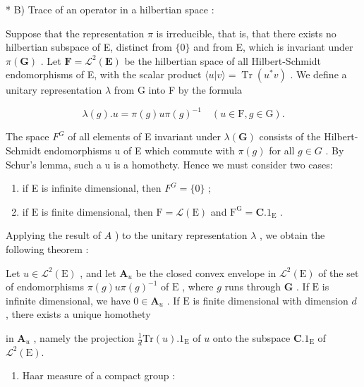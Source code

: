 * B) Trace of an operator in a hilbertian space :

Suppose that the representation \(\pi\) is irreducible, that is, that there exists no hilbertian subspace of E, distinct from \(\{0\}\) and from E, which is invariant under \(\pi(\mathbf{G})\) . Let \(\mathbf{F} = \mathcal{L}^{2}(\mathbf{E})\) be the hilbertian space of all Hilbert-Schmidt endomorphisms of E, with the scalar product \(\langle u|v\rangle = \operatorname{Tr}(u^{*}v)\) . We define a unitary representation \(\lambda\) from G into F by the formula

\[
\lambda (g). u = \pi (g) u \pi (g) ^ {- 1} \quad (u \in \mathrm{F}, g \in \mathrm{G}).\tag{3}
\]

The space \(F^{G}\) of all elements of E invariant under \(\lambda(\mathbf{G})\) consists of the Hilbert-Schmidt endomorphisms u of E which commute with \(\pi(g)\) for all \(g \in G\) . By Schur's lemma, such a u is a homothety. Hence we must consider two cases:

\begin{enumerate}
\def\labelenumi{\arabic{enumi})}
\item
  if E is infinite dimensional, then \(F^{G} = \{0\}\) ;
\item
  if \(\mathrm{E}\) is finite dimensional, then \(\mathrm{F} = \mathcal{L}(\mathrm{E})\) and \(\mathrm{F}^{\mathrm{G}} = \mathbf{C}.1_{\mathrm{E}}\) .
\end{enumerate}

Applying the result of \(A\) ) to the unitary representation \(\lambda\) , we obtain the following theorem :

Let \(u \in \mathcal{L}^2(\mathrm{E})\) , and let \(\mathbf{A}_u\) be the closed convex envelope in \(\mathcal{L}^2(\mathrm{E})\) of the set of endomorphisms \(\pi(g) u\pi(g)^{-1}\) of \(\mathrm{E}\) , where \(g\) runs through \(\mathbf{G}\) . If \(\mathrm{E}\) is infinite dimensional, we have \(0 \in \mathbf{A}_u\) . If \(\mathrm{E}\) is finite dimensional with dimension \(d\) , there exists a unique homothety

in \(\mathbf{A}_u\) , namely the projection \(\frac{1}{d}\mathrm{Tr}(u).1_{\mathrm{E}}\) of \(u\) onto the subspace \(\mathbf{C}.1_{\mathrm{E}}\) of \(\mathcal{L}^2 (\mathrm{E}).\)

\begin{enumerate}
\def\labelenumi{\Alph{enumi})}
\setcounter{enumi}{2}
\tightlist
\item
  Haar measure of a compact group :
\end{enumerate}

